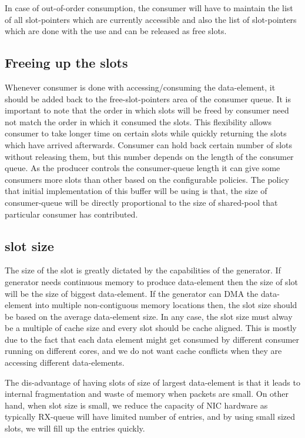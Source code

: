 \documentclass[a4paper,twoside]{report} %
\begin{document}
In case of out-of-order consumption, the consumer will have to
maintain the list of all slot-pointers which are currently accessible
and also the list of slot-pointers which are done with the use and can
be released as free slots.

\subsection{Freeing up the slots}
Whenever consumer is done with accessing/consuming the data-element,
it should be added back to the free-slot-pointers area of the consumer 
queue.  It is important to note that the order in which slots will be
freed by consumer need not match the order in which it consumed the
slots.  This flexibility allows consumer to take longer time on
certain slots while quickly returning the slots which have arrived
afterwards.  Consumer can hold back certain number of slots without
releasing them, but this number depends on the length of the consumer
queue.  As the producer controls the consumer-queue length it can give
some consumers more slots than other based on the configurable
policies.  The policy that initial implementation of this buffer will
be using is that, the size of consumer-queue will be directly
proportional to the size of shared-pool that particular consumer has
contributed.

\subsection{slot size}
The size of the slot is greatly dictated by the capabilities of the
generator.  If generator needs
continuous memory to produce data-element then the size of
slot will be the size of biggest data-element.  If the
generator can DMA the data-element into multiple non-contiguous
memory locations then, the slot size should be based on
the average data-element size.  In any case, the slot size
must alway be a multiple of cache size and every slot should
be cache aligned.  This is mostly due to the fact that each
data element might get consumed by different consumer running
on different cores, and we do not want cache conflicts when
they are accessing different data-elements.


The dis-advantage of having slots of size of largest data-element
is that it leads to internal fragmentation and waste of memory 
when packets are small.  On other hand, when slot size is small,
we reduce the capacity of NIC hardware as typically RX-queue
will have limited number of entries, and by using small sized
slots, we will fill up the entries quickly.
\end{document}
